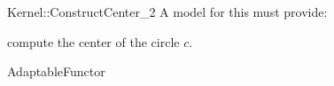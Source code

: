 \begin{ccRefFunctionObjectConcept}{Kernel::ConstructCenter_2}
A model for this must provide:


 {compute the center of the circle $c$.}

\ccRefines
AdaptableFunctor

\ccSeeAlso
{} \\

\end{ccRefFunctionObjectConcept}
